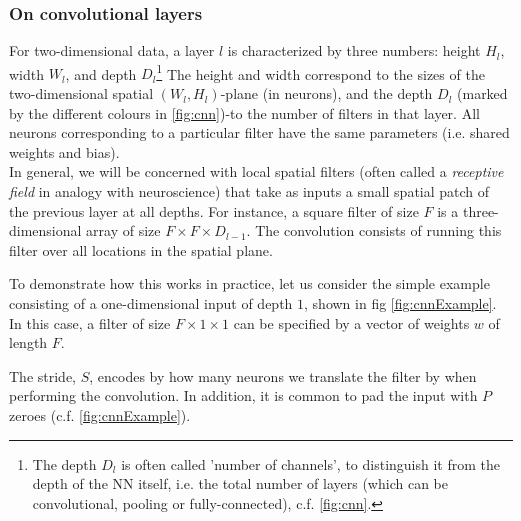 \subsubsection{On convolutional layers}
\label{subsubsec:cnnConvolutionalLayer}
For two-dimensional data, a layer $l$ is characterized by three numbers: height $H_l$, width $W_l$, and depth $D_l$\footnote{The depth $D_l$ is often called ’number of channels’, to distinguish it from the depth of the NN itself, i.e. the total number of layers (which can be convolutional, pooling or fully-connected), c.f. \ref{fig:cnn}.}
 The height and width correspond to the sizes of the two-dimensional spatial $(W_l, H_l)$-plane (in neurons), and the depth $D_l$ (marked by the different colours in \ref{fig:cnn})-to the number of filters in that layer. All neurons corresponding to a particular filter have the same parameters (i.e. shared weights and bias).\\
 In general, we will be concerned with local spatial filters (often called a \emph{receptive field} in analogy with neuroscience) that take as inputs a small spatial patch of the previous layer at all depths. For instance, a square filter of size $F$ is a three-dimensional array of size $F\times F\times D_{l-1}$. The convolution consists of running this filter over all locations in the spatial plane.
 \begin{example}
 	To demonstrate how this works in practice, let us consider the simple example consisting of a one-dimensional input of depth $1$, shown in fig \ref{fig:cnnExample}. In this case, a filter of size $F\times 1\times 1$ can be specified by a vector of weights $w$ of length $F$. 
 \end{example}
The stride, $S$, encodes by how many neurons we translate the filter by when performing the convolution. In addition, it is common to pad the input with $P$ zeroes (c.f. \ref{fig:cnnExample}).

